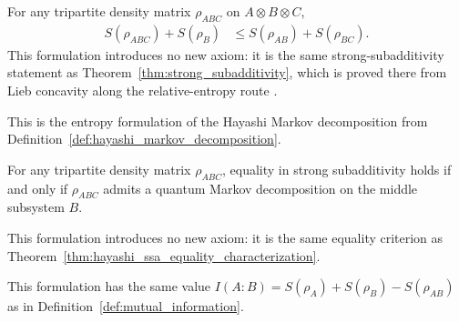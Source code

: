 \begin{theorem}\label{thm:entropy_strong_subadditivity}
    \leanok
    For any tripartite density matrix $\rho_{ABC}$ on
    $A \otimes B \otimes C$,
    \begin{align}
        S(\rho_{ABC}) + S(\rho_B)
        &\le S(\rho_{AB}) + S(\rho_{BC}).
        \label{eq:entropy_strong_subadditivity}
    \end{align}
    This formulation introduces no new axiom: it is the same
    strong-subadditivity statement as
    Theorem~\ref{thm:strong_subadditivity}, which is proved there from
    Lieb concavity along the relative-entropy route
    \cite{LiebRuskai1973Proof}.
\end{theorem}

\begin{definition}
    \label{def:entropy_quantum_markov_decomposition}
    \leanok
    This is the entropy formulation of the Hayashi Markov
    decomposition from Definition~\ref{def:hayashi_markov_decomposition}.
\end{definition}

\begin{theorem}
    \label{thm:entropy_ssa_equality_quantum_markov}
    \leanok
    For any tripartite density matrix $\rho_{ABC}$, equality in strong
    subadditivity holds if and only if $\rho_{ABC}$ admits a quantum
    Markov decomposition on the middle subsystem $B$.

    This formulation introduces no new axiom: it is the same equality
    criterion as Theorem~\ref{thm:hayashi_ssa_equality_characterization}.
\end{theorem}

\begin{definition}\label{def:entropy_mutual_information}
    \leanok
    This formulation has the same value
    $I(A{:}B) = S(\rho_A) + S(\rho_B) - S(\rho_{AB})$
    as in Definition~\ref{def:mutual_information}.
\end{definition}

